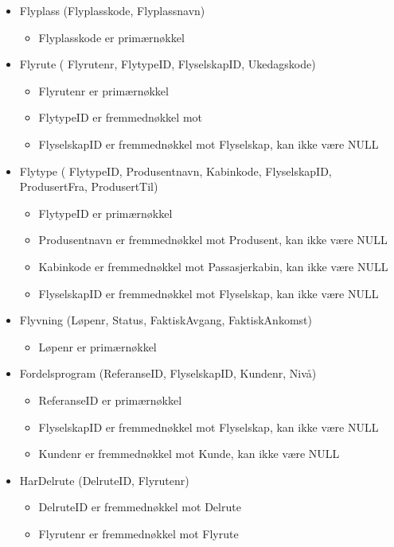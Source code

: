 \documentclass[a4paper,12pt]{article}
\begin{document}
\begin{itemize}
\item Flyplass (Flyplasskode, Flyplassnavn)
\begin{itemize}
\item Flyplasskode er primærnøkkel
\end{itemize}

\item Flyrute ( Flyrutenr, FlytypeID, FlyselskapID, Ukedagskode)
\begin{itemize}
\item Flyrutenr er primærnøkkel
\item FlytypeID er fremmednøkkel mot
\item FlyselskapID er fremmednøkkel mot Flyselskap, kan ikke være NULL
\end{itemize}

\item Flytype ( FlytypeID, Produsentnavn, Kabinkode, FlyselskapID, ProdusertFra, ProdusertTil)
\begin{itemize}
\item FlytypeID er primærnøkkel
\item Produsentnavn er fremmednøkkel mot Produsent, kan ikke være NULL
\item Kabinkode er fremmednøkkel mot Passasjerkabin, kan ikke være NULL
\item FlyselskapID er fremmednøkkel mot Flyselskap, kan ikke være NULL
\end{itemize}

\item Flyvning (Løpenr, Status, FaktiskAvgang, FaktiskAnkomst)
\begin{itemize}
\item Løpenr er primærnøkkel
\end{itemize}

\item Fordelsprogram (ReferanseID, FlyselskapID, Kundenr, Nivå)
\begin{itemize}
\item ReferanseID er primærnøkkel
\item FlyselskapID er fremmednøkkel mot Flyselskap, kan ikke være NULL
\item Kundenr er fremmednøkkel mot Kunde, kan ikke være NULL
\end{itemize}

\item HarDelrute (DelruteID, Flyrutenr)
\begin{itemize}
\item DelruteID er fremmednøkkel mot Delrute
\item Flyrutenr er fremmednøkkel mot Flyrute
\end{itemize}


\end{itemize}
\end{document}
